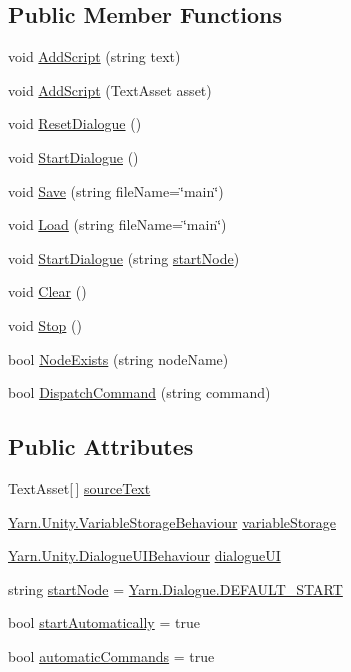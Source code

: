 \subsection*{Public Member Functions}
\begin{DoxyCompactItemize}
\item 
void \hyperlink{a00037_a88d161b1be7c99b1e202e6ae9e0d1e73}{Add\-Script} (string text)
\item 
void \hyperlink{a00037_a2fd7f165afff0b8bc2004f10ce4537dd}{Add\-Script} (Text\-Asset asset)
\item 
void \hyperlink{a00037_ac08900ac15b3ca90446b9454c7fd117e}{Reset\-Dialogue} ()
\item 
void \hyperlink{a00037_ab083d0ac60b41958b591c632e3c3a53e}{Start\-Dialogue} ()
\item 
void \hyperlink{a00037_a7d04224de4b27657edcfb3449dd182c1}{Save} (string file\-Name=\char`\"{}main\char`\"{})
\item 
void \hyperlink{a00037_a3ea5779e3b7b34853f640451616f7308}{Load} (string file\-Name=\char`\"{}main\char`\"{})
\item 
void \hyperlink{a00037_abda765c6804853e264282a0f45920cd3}{Start\-Dialogue} (string \hyperlink{a00037_a61c92b8d2228d01d8ac123b73bbb41a0}{start\-Node})
\item 
void \hyperlink{a00037_a09f5769c0c0921a21e659fed0af09c01}{Clear} ()
\item 
void \hyperlink{a00037_af94e66876098f8b187181014973645e6}{Stop} ()
\item 
bool \hyperlink{a00037_aadf7711b9ba101d6ce8ba491d9c5a4c3}{Node\-Exists} (string node\-Name)
\item 
bool \hyperlink{a00037_a7b200f8ddcf77f50906a6341aadeb671}{Dispatch\-Command} (string command)
\end{DoxyCompactItemize}
\subsection*{Public Attributes}
\begin{DoxyCompactItemize}
\item 
Text\-Asset\mbox{[}$\,$\mbox{]} \hyperlink{a00037_a71eae33d06990a3aec5d444fae017492}{source\-Text}
\item 
\hyperlink{a00089}{Yarn.\-Unity.\-Variable\-Storage\-Behaviour} \hyperlink{a00037_a6cca3d33f8b0ce3e750caed9fd8fc734}{variable\-Storage}
\item 
\hyperlink{a00038}{Yarn.\-Unity.\-Dialogue\-U\-I\-Behaviour} \hyperlink{a00037_ac87fdc65b0be57868f80c0fcd62ffd6d}{dialogue\-U\-I}
\item 
string \hyperlink{a00037_a61c92b8d2228d01d8ac123b73bbb41a0}{start\-Node} = \hyperlink{a00036_a1b643f15f734090e6a58cbf13dafd28f}{Yarn.\-Dialogue.\-D\-E\-F\-A\-U\-L\-T\-\_\-\-S\-T\-A\-R\-T}
\item 
bool \hyperlink{a00037_a6476a987f9788dba653976bcbe72980c}{start\-Automatically} = true
\item 
bool \hyperlink{a00037_a6aac5e877d5396a8141da5e85243f462}{automatic\-Commands} = true
\end{DoxyCompactItemize}
